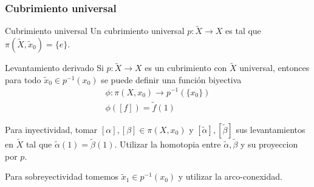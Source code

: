 \documentclass[xetex,mathserif,serif]{beamer}
\begin{document}
  \begin{frame}
    \frametitle{Cubrimiento universal}
    \begin{block}{Cubrimiento universal}
      Un cubrimiento universal \(p : \tilde X \to X\) es tal que \(\pi
      (\tilde X, \tilde x_0) = \{e\}\).
    \end{block}

    \begin{block}{Levantamiento derivado}
      Si \(p : \tilde X \to X\) es un cubrimiento con \(\tilde X\)
      universal, entonces para todo \(\tilde x_0 \in p^{-1} (x_0)\) se
      puede definir una función biyectiva
      \begin{gather*}
         \phi : \pi (X, x_0) \to p^{-1} (\{x_0\}) \\
         \phi \left( [f] \right) = \tilde f (1)
      \end{gather*}

      \pause
      Para inyectividad, tomar \([\alpha],[\beta] \in \pi (X, x_0)\) y
      \([\tilde \alpha], [\tilde \beta]\) sus levantamientos en \(\tilde
      X\) tal que \(\tilde \alpha (1) = \tilde \beta (1)\). Utilizar la
      homotopia entre \(\tilde \alpha, \tilde \beta\) y su proyeccion
      por \(p\).

      Para sobreyectividad tomemos \(\tilde x_1 \in p^{-1} (x_0)\) y
      utilizar la arco-conexidad.
    \end{block}
  \end{frame}
\end{document}
